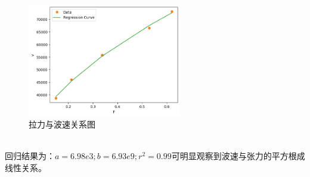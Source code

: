 \documentclass[UTF8]{ctexart}
\begin{document}
\begin{enumerate}
\begin{figure}[htbp]
    \centering
    \includegraphics[width=0.6\textwidth]{tension_vs_velocity.png}
    \caption{拉力与波速关系图}
    \label{fig:tension_vs_velocity}
\end{figure}
\\回归结果为：$a = 6.98e3; b =  6.93e9 ; r^2 =0.99 $可明显观察到波速与张力的平方根成线性关系。

\end{enumerate}
\end{document}

